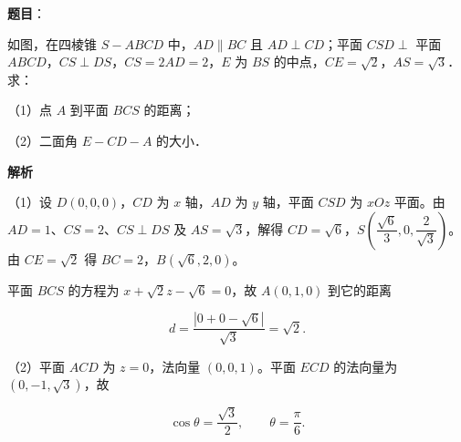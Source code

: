 \begin{answer}

\textbf{题目}：

如图，在四棱锥 $S-ABCD$ 中，$AD\parallel BC$ 且 $AD\perp CD$；平面 $CSD\perp$ 平面 $ABCD$，$CS\perp DS$，$CS=2AD=2$，$E$ 为 $BS$ 的中点，$CE=\sqrt2$，$AS=\sqrt3$．求：

（1）点 $A$ 到平面 $BCS$ 的距离；

（2）二面角 $E-CD-A$ 的大小．
\nopagebreak[4]
\begin{center}\end{center}
\nopagebreak[4]
\textbf{解析}

（1）设 $D(0,0,0)$，$CD$ 为 $x$ 轴，$AD$ 为 $y$ 轴，平面 $CSD$ 为 $xOz$ 平面。由 $AD=1$、$CS=2$、$CS\perp DS$ 及 $AS=\sqrt3$，解得 $CD=\sqrt6$，$S\left(\dfrac{\sqrt6}3,0,\dfrac2{\sqrt3}\right)$。由 $CE=\sqrt2$ 得 $BC=2$，$B(\sqrt6,2,0)$。

平面 $BCS$ 的方程为 $x+\sqrt2z-\sqrt6=0$，故 $A(0,1,0)$ 到它的距离

\nopagebreak[4]
\[d=\frac{|0+0-\sqrt6|}{\sqrt3}=\sqrt2.\]

（2）平面 $ACD$ 为 $z=0$，法向量 $(0,0,1)$。平面 $ECD$ 的法向量为 $(0,-1,\sqrt3)$，故

\nopagebreak[4]
\[\cos\theta=\frac{\sqrt3}{2},\qquad \theta=\frac\pi6.\]


\end{answer}
